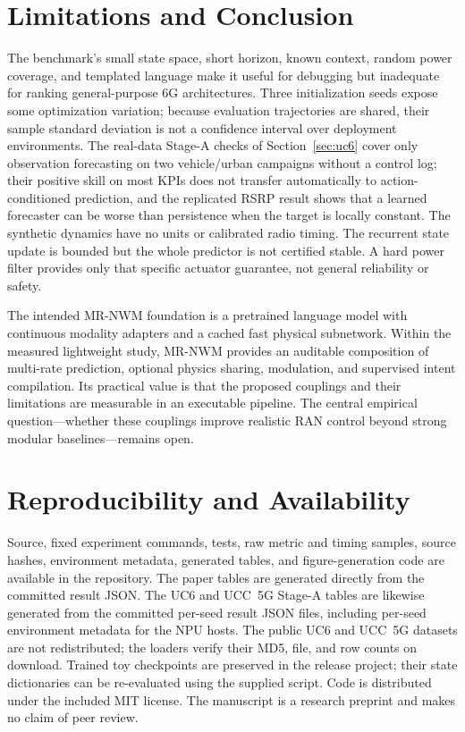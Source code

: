 \documentclass[10pt,twocolumn]{article}
\begin{document}
\section{Limitations and Conclusion}
The benchmark's small state space, short horizon, known context, random power
coverage, and templated language make it useful for debugging but inadequate
for ranking general-purpose 6G architectures. Three initialization seeds expose
some optimization variation; because evaluation trajectories are shared, their
sample standard deviation is not a confidence interval over deployment
environments. The real-data Stage-A checks of Section~\ref{sec:uc6} cover only
observation forecasting on two vehicle/urban campaigns without a control log;
their positive skill on most KPIs does not transfer automatically to
action-conditioned prediction, and the replicated RSRP result shows that a
learned forecaster can be worse than persistence when the target is locally
constant.
The synthetic dynamics have no units or calibrated radio timing.
The recurrent state update is bounded but the whole predictor is not certified
stable. A hard power filter provides only that specific actuator guarantee,
not general reliability or safety.

The intended MR-NWM foundation is a pretrained language model with continuous
modality adapters and a cached fast physical subnetwork. Within the measured
lightweight study, MR-NWM provides an auditable composition of multi-rate
prediction, optional physics sharing, modulation, and supervised intent compilation. Its practical value is that the proposed
couplings and their limitations are measurable in an executable pipeline.
The central empirical question---whether these couplings improve realistic
RAN control beyond strong modular baselines---remains open.

\section*{Reproducibility and Availability}
Source, fixed experiment commands, tests, raw metric and timing samples,
source hashes, environment metadata, generated tables, and figure-generation
code are available in the repository. The paper tables are generated directly
from the committed result JSON. The UC6 and UCC~5G Stage-A tables are likewise
generated from the committed per-seed result JSON files, including per-seed
environment metadata for the NPU hosts. The public UC6 and UCC~5G datasets
are not redistributed; the
loaders verify their MD5, file, and row counts on download. Trained toy
checkpoints are
preserved in the release project; their state dictionaries can be re-evaluated
using the supplied script. Code is distributed under the included MIT license.
The manuscript is a research preprint and makes no claim of peer review.
\end{document}

